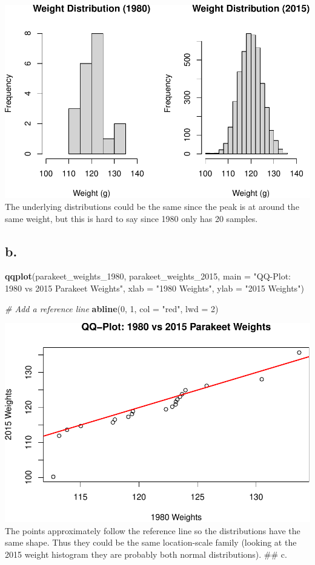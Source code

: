 \documentclass[
]{article}
\newenvironment{Shaded}{\begin{snugshade}}{\end{snugshade}}
\newcommand{\AttributeTok}[1]{\textcolor[rgb]{0.13,0.29,0.53}{#1}}
\newcommand{\CommentTok}[1]{\textcolor[rgb]{0.56,0.35,0.01}{\textit{#1}}}
\newcommand{\DecValTok}[1]{\textcolor[rgb]{0.00,0.00,0.81}{#1}}
\newcommand{\FunctionTok}[1]{\textcolor[rgb]{0.13,0.29,0.53}{\textbf{#1}}}
\newcommand{\NormalTok}[1]{#1}
\newcommand{\StringTok}[1]{\textcolor[rgb]{0.31,0.60,0.02}{#1}}
\begin{document}
\includegraphics{SDA_A2_files/figure-latex/unnamed-chunk-3-1.pdf} The
underlying distributions could be the same since the peak is at around
the same weight, but this is hard to say since 1980 only has 20 samples.

\subsection{b.}\label{b.-1}

\begin{Shaded}
\begin{Highlighting}[]
\FunctionTok{qqplot}\NormalTok{(parakeet\_weights\_1980, parakeet\_weights\_2015, }
       \AttributeTok{main =} \StringTok{"QQ{-}Plot: 1980 vs 2015 Parakeet Weights"}\NormalTok{,}
       \AttributeTok{xlab =} \StringTok{"1980 Weights"}\NormalTok{, }
       \AttributeTok{ylab =} \StringTok{"2015 Weights"}\NormalTok{)}

\CommentTok{\# Add a reference line}
\FunctionTok{abline}\NormalTok{(}\DecValTok{0}\NormalTok{, }\DecValTok{1}\NormalTok{, }\AttributeTok{col =} \StringTok{"red"}\NormalTok{, }\AttributeTok{lwd =} \DecValTok{2}\NormalTok{)}
\end{Highlighting}
\end{Shaded}

\includegraphics{SDA_A2_files/figure-latex/unnamed-chunk-4-1.pdf} The
points approximately follow the reference line so the distributions have
the same shape. Thus they could be the same location-scale family
(looking at the 2015 weight histogram they are probably both normal
distributions). \#\# c.
\end{document}
